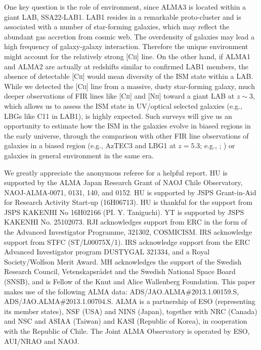 \documentclass[apj]{emulateapj}
\begin{document}
One key question is the role of environment, since ALMA3 is located within a giant LAB, SSA22-LAB1. 
LAB1 resides in a remarkable proto-cluster and is associated with a number of star-forming galaxies, which may reflect the abundant gas accretion from cosmic web. The overdensity of galaxies may lead a high frequency of galaxy-galaxy interaction. Therefore the unique environment might account for the relatively strong \textsc{[Cii]} line. On the other hand, if ALMA1 and ALMA2 are actually at redshifts similar to confirmed LAB1 members, the absence of detectable \textsc{[Cii]} would mean diversity of the ISM state within a LAB.
While we detected the \textsc{[Cii]} line from a massive, dusty star-forming galaxy,
much deeper observations of FIR lines like \textsc{[Cii]} and \textsc{[Nii]} toward a giant LAB at $z\sim3$, which allows us to assess the ISM state in UV/optical selected  galaxies (e.g., LBGs like C11 in LAB1), is highly expected.
Such surveys will give us an opportunity to estimate how the ISM in the galaxies evolve in biased regions in the early universe, through the comparison with other FIR line observations of galaxies in a biased region (e.g., AzTEC3 and LBG1 at $z=5.3$; e.g., \citealt{2014ApJ...796...84R}; \citealt{2016arXiv160702520P}) or galaxies in general environment in the same era.
 



\acknowledgments
We greatly appreciate the anonymous referee for a helpful report.
HU is supported by the ALMA Japan Research Grant of NAOJ Chile Observatory, NAOJ-ALMA-0071, 0131, 140, and 0152. HU is supported by JSPS Grant-in-Aid for Research Activity Start-up (16H06713).
HU is thankful for the support from JSPS KAKENHI No 16H02166 (PI. Y. Taniguchi). 
YT is supported by JSPS KAKENHI No. 25102073.
RJI acknowledges support from ERC in the form of the Advanced Investigator Programme, 321302, COSMICISM.
IRS acknowledge support from STFC (ST/L00075X/1).
IRS acknowledge support from the ERC Advanced Investigator program
DUSTYGAL 321334, and a Royal Society/Wolfson Merit Award. 
MH acknowledges the support of the Swedish Research Council,
Vetenskapsr{\aa}det and the Swedish National Space Board (SNSB), and is Fellow of the Knut and Alice Wallenberg Foundation.
This paper makes use of the following ALMA data: ADS/JAO.ALMA\#2013.1.00159.S, ADS/JAO.ALMA\#2013.1.00704.S. ALMA is a partnership of ESO (representing its member states), NSF (USA) and NINS (Japan), together with NRC (Canada) and NSC and ASIAA (Taiwan) and KASI (Republic of Korea), in cooperation with the Republic of Chile. The Joint ALMA Observatory is operated by ESO, AUI/NRAO and NAOJ.
\end{document}
